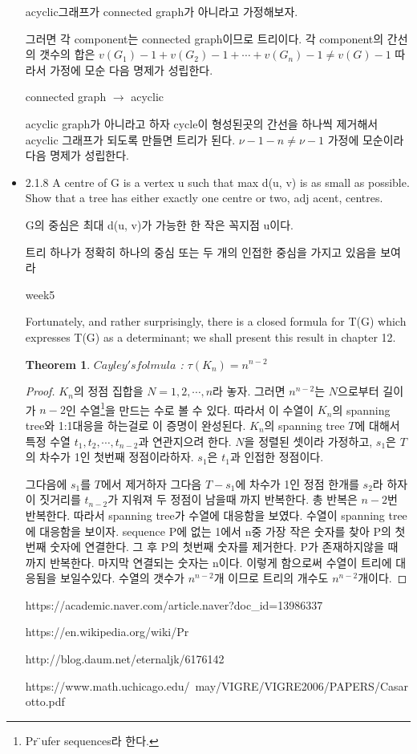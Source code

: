 \documentclass{oblivoir}
\newtheorem{theorem}{Theorem}[section]
\begin{document}
\begin{itemize}
    acyclic그래프가 connected graph가 아니라고 가정해보자.

    그러면 각 component는 connected graph이므로 트리이다.
    각 component의 간선의 갯수의 합은 $v(G_1)-1 + v(G_2)-1 + \cdots + v(G_n)-1 \neq v(G)-1 $
    따라서 가정에 모순 다음 명제가 성립한다.

    connected graph $\rightarrow$ acyclic

    acyclic graph가 아니라고 하자 cycle이 형성된곳의 간선을 하나씩 제거해서 acyclic 그래프가 되도록 만들면 트리가 된다.
    $\nu-1-n \neq \nu -1 $ 가정에 모순이라 다음 명제가 성립한다.

    \item  2.1.8
    A centre of G is a vertex u such that max d(u, v) is as small as possible.
    Show that a tree has either exactly one centre or two,
    adj acent, centres.


    G의 중심은 최대 d(u, v)가 가능한 한 작은 꼭지점 u이다.

    트리 하나가 정확히 하나의 중심 또는 두 개의 인접한 중심을 가지고 있음을 보여라

    week5
    \begin{dfn}
        
    \end{dfn}
    

    Fortunately, and rather surprisingly, there is a closed formula for T(G) which expresses T(G) as a determinant; 
    we shall present this result in chapter 12.


    \begin{theorem}
        $Cayley's folmula$ : $\tau(K_n)= n^{n-2}$
    \end{theorem}

    \begin{proof}
        $K_n$의 정점 집합을 $N = {1,2, \cdots,n}$라 놓자.
        그러면 $n^{n-2}$는  $N$으로부터 길이가 $n-2$인 수열\footnote{Pr ̈ufer sequences라 한다.}을 만드는 수로 볼 수 있다.
        따라서 이 수열이 $K_n$의 spanning tree와 1:1대응을 하는걸로 이 증명이 완성된다.
        $K_n$의 spanning tree $T$에 대해서 특정 수열 ${t_1, t_2, \cdots , t_{n-2}}$과 연관지으려 한다.
        $N$을 정렬된 셋이라 가정하고, $s_1$은 $T$의 차수가 1인 첫번째 정점이라하자. $s_1$은 $t_1$과 인접한 정점이다.
        
        그다음에 $s_1$를 $T$에서 제거하자 그다음 $T-s_1$에 차수가 1인 정점 한개를 $s_2$라 하자 이 짓거리를 $t_{n-2}$가 지워져 두 정점이 남을때 까지 반복한다. 총 반복은 $n-2$번 반복한다. 따라서 spanning tree가 수열에 대응함을 보였다.
        수열이 spanning tree에 대응함을 보이자.
        sequence P에 없는 1에서 n중 가장 작은 숫자를 찾아 P의 첫번째 숫자에 연결한다.
        그 후 P의 첫번째 숫자를 제거한다.
        P가 존재하지않을 때 까지 반복한다. 마지막 연결되는 숫자는 n이다.
        이렇게 함으로써 수열이 트리에 대응됨을 보일수있다.
        수열의 갯수가 $n^{n-2}$개 이므로 트리의 개수도 $n^{n-2}$개이다.
    \end{proof}
    https://academic.naver.com/article.naver?doc_id=13986337

    https://en.wikipedia.org/wiki/Pr%

    http://blog.daum.net/eternaljk/6176142

    https://www.math.uchicago.edu/~may/VIGRE/VIGRE2006/PAPERS/Casarotto.pdf

    \end{itemize}
\end{document}
